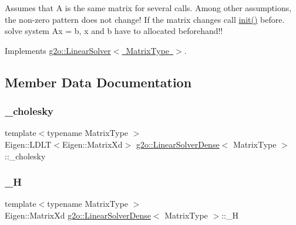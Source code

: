 Assumes that A is the same matrix for several calls. Among other assumptions, the non-\/zero pattern does not change! If the matrix changes call \mbox{\hyperlink{classg2o_1_1_linear_solver_dense_a24f68ecd4b022269dbfc4d990eb5c57b}{init()}} before. solve system Ax = b, x and b have to allocated beforehand!! 

Implements \mbox{\hyperlink{classg2o_1_1_linear_solver_aa44b40826d50203c8ce2ff258c34e030}{g2o\+::\+Linear\+Solver$<$ Matrix\+Type $>$}}.



\subsection{Member Data Documentation}
\mbox{\label{classg2o_1_1_linear_solver_dense_a20fc35e2f25107a6e36211861034aae0}} 
\subsubsection{\texorpdfstring{\+\_\+cholesky}{\_cholesky}}
{\footnotesize\ttfamily template$<$typename Matrix\+Type $>$ \\
Eigen\+::\+L\+D\+LT$<$Eigen\+::\+Matrix\+Xd$>$ \mbox{\hyperlink{classg2o_1_1_linear_solver_dense}{g2o\+::\+Linear\+Solver\+Dense}}$<$ Matrix\+Type $>$\+::\+\_\+cholesky\hspace{0.3cm}{\ttfamily [protected]}}

\mbox{\label{classg2o_1_1_linear_solver_dense_a5ca6a1f2358ce0620dbdbae3fdc9fc99}} 
\subsubsection{\texorpdfstring{\+\_\+H}{\_H}}
{\footnotesize\ttfamily template$<$typename Matrix\+Type $>$ \\
Eigen\+::\+Matrix\+Xd \mbox{\hyperlink{classg2o_1_1_linear_solver_dense}{g2o\+::\+Linear\+Solver\+Dense}}$<$ Matrix\+Type $>$\+::\+\_\+H\hspace{0.3cm}{\ttfamily [protected]}}

